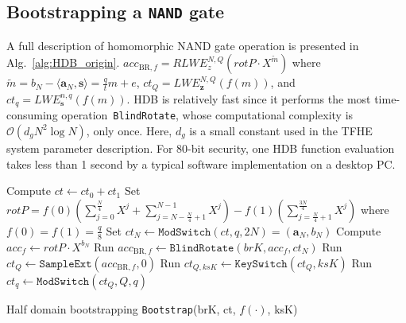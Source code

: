 \documentclass{iacrtrans}
\theoremstyle{plain}
\begin{document}
\subsection{Bootstrapping a \texttt{NAND} gate}
A full description of homomorphic NAND gate operation is presented in Alg.~\ref{alg:HDB_origin}. $acc_{\text{BR},f}=RLWE_{z}^{N,Q}(rotP\cdot X^{\widetilde{m}})$ where $\widetilde{m}=b_N-\langle\mathbf{a}_N,\mathbf{s}\rangle=\frac{q}{t}m+e$, $ct_Q=LWE_{\mathbf{z}}^{N,Q}(f(m))$, and $ct_q=LWE_{\mathbf{s}}^{n,q}(f(m))$. 
HDB is relatively fast since it  performs the most time-consuming operation~\texttt{BlindRotate}, whose computational complexity is $\mathcal{O}(d_gN^2\log N)$, only once. Here, 
$d_g$ is a small constant used  in the TFHE system parameter description. 
For 80-bit security, one HDB function evaluation takes less than 1 second by a typical software implementation on a desktop PC. 

 
\begin{algorithm}[!tbh]
\DontPrintSemicolon %
   Compute $ct\gets ct_0+ct_1$ \;
   Set $rotP=f(0)\left(\sum_{j=0}^{\frac{N}{4}}X^j + \sum_{j=N-\frac{N}{4}+1}^{N-1}X^j\right ) - f(1)\left(\sum_{j=\frac{N}{4}+1}^{\frac{3N}{4}} X^j\right )$ where $f(0)=f(1)=\frac{q}{8}$\;
   Set $ct_N \gets \texttt{ModSwitch}(ct, q, 2N)=(\mathbf{a}_N,b_N)$\;
   Compute $acc_f \gets rotP\cdot X^{b_N}$\;
   Run $acc_{\text{BR},f} \gets \texttt{BlindRotate}(brK,acc_f,ct_N)$\;
   Run $ct_Q \gets \texttt{SampleExt}(acc_{\text{BR},f},0)$\;
   Run $ct_{Q,ksK} \gets \texttt{KeySwitch}(ct_Q, ksK)$\;
   Run $ct_q \gets \texttt{ModSwitch}(ct_Q, Q, q)$\;
\caption{Half domain bootstrapping \texttt{Bootstrap}(brK, ct, $f(\cdot)$, ksK)}\label{alg:HDB_origin}
\end{algorithm}
\end{document}
